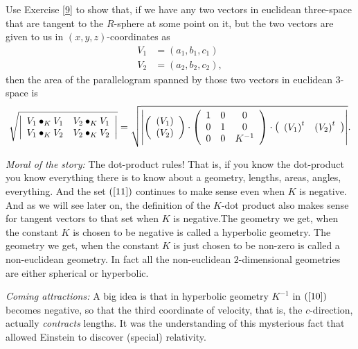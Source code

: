 \begin{exercise}
\label{222}Use Exercise \ref{9} to show that, if we have any two vectors in
euclidean three-space that are tangent to the $R$-sphere at some point on it,
but the two vectors are given to us in $\left(  x,y,z\right)  $-coordinates as%
\begin{align*}
V_{1}  &  =\left(  a_{1},b_{1},c_{1}\right) \\
V_{2}  &  =\left(  a_{2},b_{2},c_{2}\right)  ,
\end{align*}
then the area of the parallelogram spanned by those two vectors in euclidean
$3$-space is%
\[
\sqrt{\left\vert
\begin{array}
[c]{cc}%
V_{1}\bullet_{K}V_{1} & V_{2}\bullet_{K}V_{1}\\
V_{1}\bullet_{K}V_{2} & V_{2}\bullet_{K}V_{2}%
\end{array}
\right\vert }=\sqrt{\left\vert \left(
\begin{array}
[c]{c}%
\left(  V_{1}\right) \\
\left(  V_{2}\right)
\end{array}
\right)  \cdot\left(
\begin{array}
[c]{ccc}%
1 & 0 & 0\\
0 & 1 & 0\\
0 & 0 & K^{-1}%
\end{array}
\right)  \cdot\left(
\begin{array}
[c]{cc}%
\left(  V_{1}\right)  ^{t} & \left(  V_{2}\right)  ^{t}%
\end{array}
\right)  \right\vert }.
\]

\end{exercise}

\textit{Moral of the story:} The dot-product rules! That is, if you know the
dot-product you know everything there is to know about a geometry, lengths,
areas, angles, everything. And the set $\left(  \ref{11}\right)  $ continues
to make sense even when $K$ is negative. And as we will see later on, the
definition of the $K$-dot product also makes sense for tangent vectors to that
set when $K$ is negative.The geometry we get, when the constant $K$ is chosen
to be negative is called a hyperbolic geometry. The geometry we get, when the
constant $K$ is just chosen to be non-zero is called a non-euclidean geometry.
In fact all the non-euclidean $2$-dimensional geometries are either spherical
or hyperbolic.

\textit{Coming attractions:} A big idea is that in hyperbolic geometry
$K^{-1}$ in $\left(  \ref{10}\right)  $ becomes negative, so that the third
coordinate of velocity, that is, the $c$-direction, actually
\textit{contracts} lengths. It was the understanding of this mysterious fact
that allowed Einstein to discover (special) relativity.
